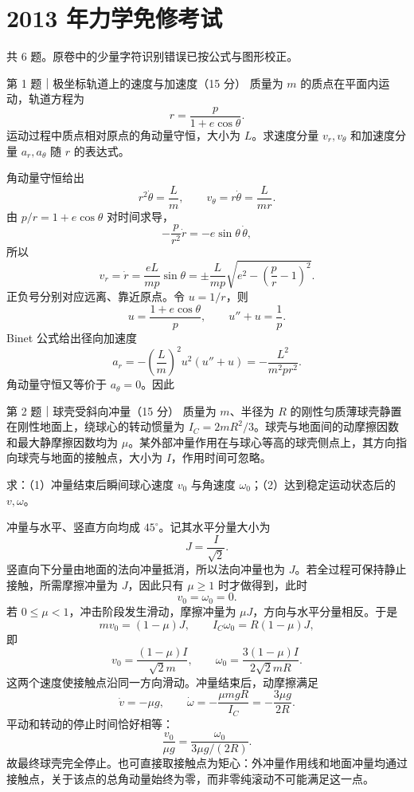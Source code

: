 \chapter{2013 年力学免修考试}
\noindent{}\quad{}\qquad 共 6 题。原卷中的少量字符识别错误已按公式与图形校正。

\begin{problem}{第 1 题｜极坐标轨道上的速度与加速度（15 分）}
质量为 $m$ 的质点在平面内运动，轨道方程为
\[
r=\frac{p}{1+e\cos\theta}.
\]
运动过程中质点相对原点的角动量守恒，大小为 $L$。求速度分量 $v_r,v_\theta$ 和加速度分量 $a_r,a_\theta$ 随 $r$ 的表达式。
\end{problem}
\begin{solution}
角动量守恒给出
\[
r^2\dot\theta=\frac{L}{m},\qquad v_\theta=r\dot\theta=\frac{L}{mr}.
\]
由 $p/r=1+e\cos\theta$ 对时间求导，
\[
-\frac{p}{r^2}\dot r=-e\sin\theta\,\dot\theta,
\]
所以
\[
v_r=\dot r=\frac{eL}{mp}\sin\theta
=\pm\frac{L}{mp}\sqrt{e^2-\left(\frac{p}{r}-1\right)^2}.
\]
正负号分别对应远离、靠近原点。令 $u=1/r$，则
\[
u=\frac{1+e\cos\theta}{p},\qquad u''+u=\frac1p.
\]
Binet 公式给出径向加速度
\[
a_r=-\left(\frac{L}{m}\right)^2u^2(u''+u)
=-\frac{L^2}{m^2pr^2}.
\]
角动量守恒又等价于 $a_\theta=0$。因此
\end{solution}

\begin{problem}{第 2 题｜球壳受斜向冲量（15 分）}
质量为 $m$、半径为 $R$ 的刚性匀质薄球壳静置在刚性地面上，绕球心的转动惯量为 $I_C=2mR^2/3$。球壳与地面间的动摩擦因数和最大静摩擦因数均为 $\mu$。某外部冲量作用在与球心等高的球壳侧点上，其方向指向球壳与地面的接触点，大小为 $I$，作用时间可忽略。

求：（1）冲量结束后瞬间球心速度 $v_0$ 与角速度 $\omega_0$；（2）达到稳定运动状态后的 $v,\omega$。
\FigImpulseSphere
\end{problem}
\begin{solution}
冲量与水平、竖直方向均成 $45^\circ$。记其水平分量大小为
\[
J=\frac{I}{\sqrt2}.
\]
竖直向下分量由地面的法向冲量抵消，所以法向冲量也为 $J$。若全过程可保持静止接触，所需摩擦冲量为 $J$，因此只有 $\mu\ge1$ 时才做得到，此时
\[
v_0=\omega_0=0.
\]
若 $0\le\mu<1$，冲击阶段发生滑动，摩擦冲量为 $\mu J$，方向与水平分量相反。于是
\[
m v_0=(1-\mu)J,
\qquad
I_C\omega_0=R(1-\mu)J,
\]
即
\[
v_0=\frac{(1-\mu)I}{\sqrt2m},
\qquad
\omega_0=\frac{3(1-\mu)I}{2\sqrt2mR}.
\]
这两个速度使接触点沿同一方向滑动。冲量结束后，动摩擦满足
\[
\dot v=-\mu g,
\qquad
\dot\omega=-\frac{\mu mgR}{I_C}=-\frac{3\mu g}{2R}.
\]
平动和转动的停止时间恰好相等：
\[
\frac{v_0}{\mu g}=\frac{\omega_0}{3\mu g/(2R)}.
\]
故最终球壳完全停止。也可直接取接触点为矩心：外冲量作用线和地面冲量均通过接触点，关于该点的总角动量始终为零，而非零纯滚动不可能满足这一点。
\end{solution}

